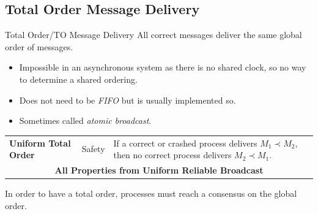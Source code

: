 \subsection{Total Order Message Delivery}
\begin{definitionbox}{Total Order/TO Message Delivery}
    All correct messages deliver the same global order of messages.
    \begin{itemize}
        \item Impossible in an asynchronous system as there is no shared clock, so no way to determine a shared ordering. 
        \item Does not need to be \textit{FIFO} but is usually implemented so.
        \item Sometimes called \textit{atomic broadcast}.
    \end{itemize}
    \begin{center}
        \begin{tabular}{l l p{}}
            \textbf{Uniform Total Order} & Safety & If a correct or crashed process delivers $M_1 \prec M_2$, then no correct process delivers $M_2 \prec M_1$. \\
            \multicolumn{3}{c}{\textbf{All Properties from Uniform Reliable Broadcast}} \\
        \end{tabular}
    \end{center}
    In order to have a total order, processes must reach a consensus on the global order.
\end{definitionbox}
